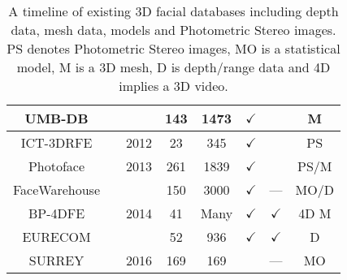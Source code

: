 \begin{table}[]
{\begin{tabular}{@{}cccccccc@{}}
UMB-DB                     &\cite{colombo2011umb}          &                       & 143         & 1473        & $\checkmark$ &              & M      \\ \midrule
ICT-3DRFE                  &\cite{stratou2012exploring}    & 2012                  & 23          & 345         & $\checkmark$ &              & PS     \\ \midrule
Photoface                  &\cite{RefWorks:293}            & 2013                  & 261         & 1839        & $\checkmark$ &              & PS/M   \\ \midrule
FaceWarehouse              &\cite{Cao:2014gy}              & \multirow{3}{*}{2014} & 150         & 3000        & $\checkmark$ & ---          & MO/D   \\
BP-4DFE                    &\cite{Zhang:2014id}            &                       & 41          & Many        & $\checkmark$ & $\checkmark$ & 4D M   \\
EURECOM                    &\cite{min2014kinectfacedb}     &                       & 52          & 936         & $\checkmark$ & $\checkmark$ & D      \\ \midrule
SURREY                     &\cite{Huber:F5Dca9zy}          & 2016                  & 169         & 169         &              & ---          & MO     \\ \bottomrule
\end{tabular}%
}
\caption{A timeline of existing 3D facial databases including depth data, mesh
         data, models and Photometric Stereo images. PS denotes Photometric
         Stereo images, MO is a statistical model, M is a 3D mesh, 
         D is depth/range data and 4D implies a 3D video.}
\label{tbl:timeline_db}
\end{table}
